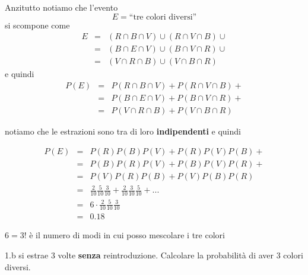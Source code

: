 \documentclass[
  11pt,
]{book}
\theoremstyle{mytheoremstyle}
\theoremstyle{mydefstyle}
\newenvironment{nota}
  {
\begin{tcolorbox}[enhanced,breakable,arc=0.1mm,boxrule=1pt,colback=white,colframe=iblue,title=\bf \fontfamily{lmss}\selectfont \faInfoCircle \hspace{.5 cm} Nota,drop fuzzy shadow]
}{
\end{tcolorbox}
  }
\newenvironment{sol}
  {
  \begin{tcolorbox}[enhanced,breakable,arc=0.1mm,boxrule=1pt,colback=white,colframe=iblue,
  title=\bf \fontfamily{lmss}\selectfont \hspace{.5 cm} Soluzione,drop fuzzy shadow]

}{
\end{tcolorbox}
  }
\begin{document}
\begin{sol}

Anzitutto notiamo che l'evento
\[
E=\text{“tre colori diversi”}
\]
si scompone come
\begin{eqnarray*}
  E     &=&  (R\cap B\cap V)\cup(R\cap V\cap B)\cup\\
        &=&  (B\cap E\cap V)\cup(B\cap V\cap R)\cup\\
        &=&  (V\cap R\cap B)\cup(V\cap B\cap R)
\end{eqnarray*}
e quindi
\begin{eqnarray*}
  P(E)  &=& P(R\cap B\cap V)+P(R\cap V\cap B)+\\
        &=& P(B\cap E\cap V)+P(B\cap V\cap R)+\\
        &=& P(V\cap R\cap B)+P(V\cap B\cap R)
\end{eqnarray*}

notiamo che le estrazioni sono tra di loro \textbf{indipendenti} e quindi

\begin{eqnarray*}
  P(E)  &=& P(R)P(B)P(V)+P(R)P(V)P(B)+\\
        &=& P(B)P(R)P(V)+P(B)P(V)P(R)+\\
        &=& P(V)P(R)P(B)+P(V)P(B)P(R)\\
        &=& \frac2{10}\frac5{10}\frac3{10}+\frac2{10}\frac3{10}\frac5{10}+...\\
        &=& 6 \cdot \frac2{10}\frac5{10}\frac3{10}\\
        &=& 0.18
\end{eqnarray*}

\begin{nota}
\(6=3!\) è il numero di modi in cui posso mescolare i tre colori

\end{nota}

\end{sol}

1.b si estrae 3 volte \textbf{senza} reintroduzione.
Calcolare la probabilità di aver 3 colori diversi.
\end{document}

